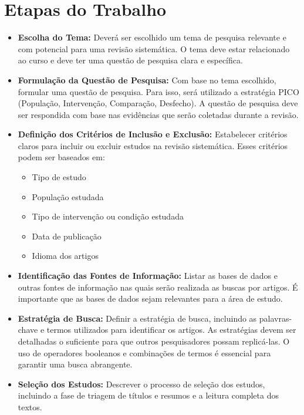 \documentclass[a4paper,12pt]{article}
\begin{document}
\section{Etapas do Trabalho}
\begin{itemize}
    \item \textbf{Escolha do Tema:} Deverá ser escolhido um tema de pesquisa relevante e com potencial para uma revisão sistemática. O tema deve estar relacionado ao curso e deve ter uma questão de pesquisa clara e específica.
    
    \item \textbf{Formulação da Questão de Pesquisa:} Com base no tema escolhido, formular uma questão de pesquisa. Para isso, será utilizado a estratégia PICO (População, Intervenção, Comparação, Desfecho). A questão de pesquisa deve ser respondida com base nas evidências que serão coletadas durante a revisão.
    
    \item \textbf{Definição dos Critérios de Inclusão e Exclusão:} Estabelecer critérios claros para incluir ou excluir estudos na revisão sistemática. Esses critérios podem ser baseados em:
    \begin{itemize}
        \item Tipo de estudo
        \item População estudada
        \item Tipo de intervenção ou condição estudada
        \item Data de publicação
        \item Idioma dos artigos
    \end{itemize}
    
    \item \textbf{Identificação das Fontes de Informação:} Listar as bases de dados e outras fontes de informação nas quais serão realizada as buscas por artigos. É importante que as bases de dados sejam relevantes para a área de estudo.
    
    \item \textbf{Estratégia de Busca:} Definir a estratégia de busca, incluindo as palavras-chave e termos utilizados para identificar os artigos. As estratégias devem ser detalhadas o suficiente para que outros pesquisadores possam replicá-las. O uso de operadores booleanos e combinações de termos é essencial para garantir uma busca abrangente.
    
    \item \textbf{Seleção dos Estudos:} Descrever o processo de seleção dos estudos, incluindo a fase de triagem de títulos e resumos e a leitura completa dos textos.
    

\end{itemize}
\end{document}

